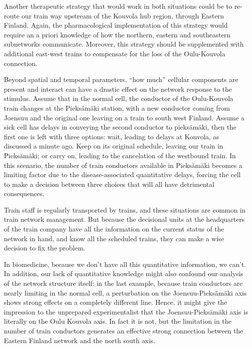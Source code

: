 \documentclass[
]{book}
\begin{document}
Another therapeutic strategy that would work in both situations could be to re-route our train way upstream of the Kouvola hub region, through Eastern Finland. Again, the pharmacological implementation of this strategy would require an a priori knowledge of how the northern, eastern and southeastern subnetworks communicate. Moreover, this strategy should be supplemented with additional east-west trains to compensate for the loss of the Oulu-Kouvola connection.

Beyond spatial and temporal parameters, ``how much'' cellular components are present and interact can have a drastic effect on the network response to the stimulus. Assume that in the normal cell, the conductor of the Oulu-Kouvola train changes at the Pieksämäki station, with a new conductor coming from Joensuu and the original one leaving on a train to south west Finland. Assume a sick cell has delays in conveying the second conductor to pieksämäki, then the first one is left with three options: wait, leading to delays at Kouvola, as discussed a minute ago. Keep on its original schedule, leaving our train in Pieksämäki; or carry on, leading to the cancelation of the westbound train. In this scenario, the number of train conductors available in Pieksämäki becomes a limiting factor due to the disease-associated quantitative delays, forcing the cell to make a decision between three choices that will all have detrimental consequences.

Train staff is regularly transported by trains, and these situations are common in train network management. But because the decisional units at the headquarters of the train company have all the information on the current status of the network in hand, and know all the scheduled trains, they can make a wise decision to fix the problem.

In biomedicine, because we don't have all this quantitative information, we can't. In addition, our lack of quantitative knowledge might also confound our analysis of the network structure itself: in the last example, because train conductors are nearly limiting in the normal cell, a perturbation on the Joensuu-Pieksämäki axis shows strong effects on a completely different line. Hence, it might give the impression to the unprepared experimentalist that the Joensuu-Pieksämäki axis is literally on the Oulu Kouvola axis. In fact it is not, but the limitation in the number of train conductors generates an effective strong connection between the Eastern Finland network and the north south axis.
\end{document}
